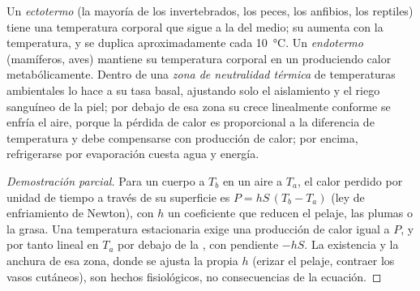 \begin{proposition}\label{prop:b1:organism-environment:thermo}
Un \emph{ectotermo} (la mayoría de los invertebrados, los
peces, los anfibios, los reptiles) tiene una temperatura corporal que sigue
a la del medio; su  aumenta con la temperatura, y se duplica
aproximadamente cada \qty{10}{\celsius}. Un
\emph{endotermo} (mamíferos, aves) mantiene su temperatura
corporal en un  produciendo calor metabólicamente. Dentro
de una \emph{zona de neutralidad térmica}
de temperaturas ambientales lo hace a su tasa basal, ajustando solo el
aislamiento y el riego sanguíneo de la piel; por debajo de esa zona su  crece linealmente conforme se enfría el aire, porque la pérdida
de calor es proporcional a la diferencia de temperatura y debe compensarse
con producción de calor; por encima, refrigerarse por evaporación cuesta
agua y energía.
\end{proposition}
\begin{proof}[Demostración parcial]
Para un cuerpo a $T_b$ en un aire a $T_a$, el calor perdido por unidad de
tiempo a través de su superficie es $P = hS\,(T_b - T_a)$ (ley de
enfriamiento de Newton), con $h$ un coeficiente que reducen el pelaje, las
plumas o la grasa. Una temperatura estacionaria exige una producción de
calor igual a $P$, y por tanto lineal en $T_a$ por debajo de la , con pendiente $-hS$. La existencia y la anchura de esa
zona, donde se ajusta la propia $h$ (erizar el pelaje, contraer los vasos
cutáneos), son hechos fisiológicos, no consecuencias de la ecuación.
\end{proof}

